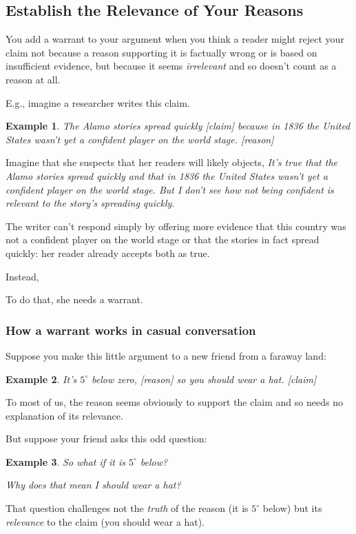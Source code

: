 \documentclass[oneside]{book}
\numberwithin{equation}{section}
\newtheorem{example}{Example}[section]
\begin{document}
\subsection{Establish the Relevance of Your Reasons}

You add a warrant to your argument when you think a reader might reject your claim not because a reason supporting it is factually wrong or is based on insufficient evidence, but because it seems \textit{irrelevant} and so doesn't count as a reason at all.

%
E.g., imagine a researcher writes this claim.
\begin{example}
    The Alamo stories spread quickly \emph{[claim]} because in 1836 the United States wasn't yet a confident player on the world stage. \emph{[reason]}
\end{example}
Imagine that she suspects that her readers will likely objects, \textit{It's true that the Alamo stories spread quickly and that in 1836 the United States wasn't yet a confident player on the world stage. But I don't see how not being confident is relevant to the story's spreading quickly}.

The writer can't respond simply by offering more evidence that this country was not a confident player on the world stage or that the stories in fact spread quickly: her reader already accepts both as true.

Instead, 

To do that, she needs a warrant.

\subsubsection{How a warrant works in casual conversation}
Suppose you make this little argument to a new friend from a faraway land:
\begin{example}
    It's $5^\circ$ below zero, \emph{[reason]} so you should wear a hat. \emph{[claim]}
\end{example}
To most of us, the reason seems obviously to support the claim and so needs no explanation of its relevance.

But suppose your friend asks this odd question:
\begin{example}
    So what if it is $5^\circ$ below?
    
    Why does that mean I should wear a hat?
\end{example}
That question challenges not the \textit{truth} of the reason (it is $5^\circ$ below) but its \textit{relevance} to the claim (you should wear a hat).
\end{document}
